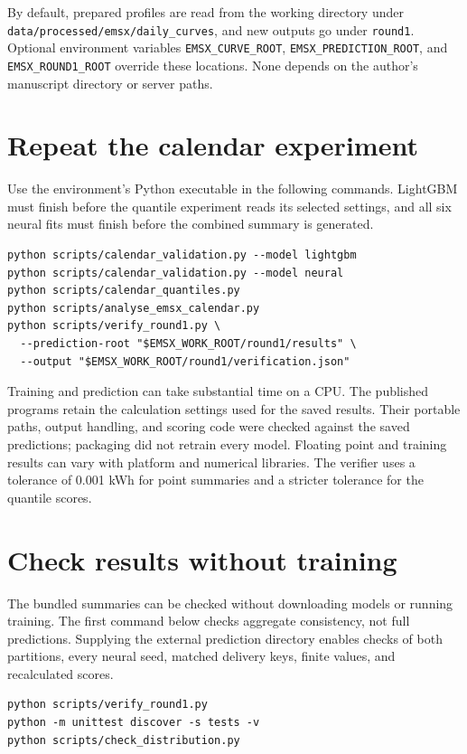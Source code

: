 By default, prepared profiles are read from the working directory under
\texttt{data/processed/emsx/daily\_curves}, and new outputs go under
\texttt{round1}. Optional environment variables \texttt{EMSX\_CURVE\_ROOT},
\texttt{EMSX\_PREDICTION\_ROOT}, and \texttt{EMSX\_ROUND1\_ROOT} override these
locations. None depends on the author's manuscript directory or server paths.

\section*{Repeat the calendar experiment}

Use the environment's Python executable in the following commands. LightGBM
must finish before the quantile experiment reads its selected settings, and all
six neural fits must finish before the combined summary is generated.

\begin{verbatim}
python scripts/calendar_validation.py --model lightgbm
python scripts/calendar_validation.py --model neural
python scripts/calendar_quantiles.py
python scripts/analyse_emsx_calendar.py
python scripts/verify_round1.py \
  --prediction-root "$EMSX_WORK_ROOT/round1/results" \
  --output "$EMSX_WORK_ROOT/round1/verification.json"
\end{verbatim}

Training and prediction can take substantial time on a CPU. The published
programs retain the calculation settings used for the saved results. Their
portable paths, output handling, and scoring code were checked against the
saved predictions; packaging did not retrain every model. Floating point and
training results can vary with platform and numerical libraries. The verifier
uses a tolerance of 0.001 kWh for point summaries and a stricter tolerance for
the quantile scores.

\section*{Check results without training}

The bundled summaries can be checked without downloading models or running
training. The first command below checks aggregate consistency, not full
predictions. Supplying the external prediction directory enables checks of
both partitions, every neural seed, matched delivery keys, finite values,
and recalculated scores.

\begin{verbatim}
python scripts/verify_round1.py
python -m unittest discover -s tests -v
python scripts/check_distribution.py
\end{verbatim}

